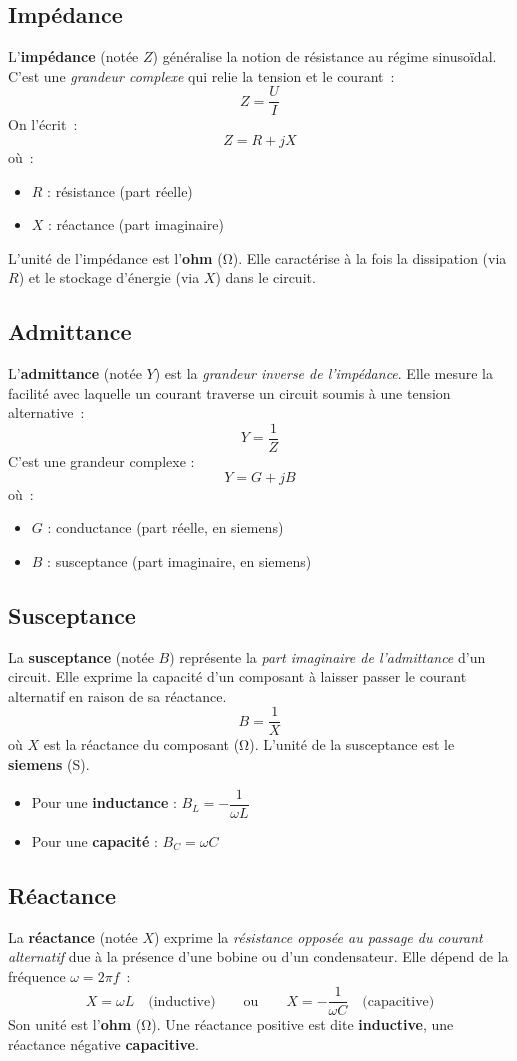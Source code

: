 \subsection{Imp\'edance}
L'\textbf{imp\'edance} (not\'ee $Z$) g\'en\'eralise la notion de r\'esistance au r\'egime sinusoïdal. C’est une \emph{grandeur complexe} qui relie la tension et le courant~:
\[
Z = \frac{U}{I}
\]
On l’\'ecrit~:
\[
Z = R + jX
\]
o\`u~:
\begin{itemize}
  \item $R$ : r\'esistance (part r\'eelle)
  \item $X$ : r\'eactance (part imaginaire)
\end{itemize}
L’unit\'e de l’imp\'edance est l’\textbf{ohm} (\unit{\ohm}). Elle caract\'erise à la fois la dissipation (via $R$) et le stockage d’\'energie (via $X$) dans le circuit.

\subsection{Admittance}
L'\textbf{admittance} (not\'ee $Y$) est la \emph{grandeur inverse de l'imp\'edance}. Elle mesure la facilit\'e avec laquelle un courant traverse un circuit soumis à une tension alternative~:
\[
Y = \frac{1}{Z}
\]
C’est une grandeur complexe :
\[
Y = G + jB
\]
o\`u~:
\begin{itemize}
  \item $G$ : conductance (part r\'eelle, en siemens)
  \item $B$ : susceptance (part imaginaire, en siemens)
\end{itemize}

\subsection{Susceptance}
La \textbf{susceptance} (not\'ee $B$) repr\'esente la \emph{part imaginaire de l'admittance} d'un circuit.
Elle exprime la capacit\'e d'un composant à laisser passer le courant alternatif en raison de sa r\'eactance.
\[
B = \frac{1}{X}
\]
o\`u $X$ est la r\'eactance du composant (\unit{\ohm}).
L'unit\'e de la susceptance est le \textbf{siemens} (\unit{\siemens}).
\begin{itemize}
  \item Pour une \textbf{inductance} : $B_L = -\dfrac{1}{\omega L}$
  \item Pour une \textbf{capacit\'e} : $B_C = \omega C$
\end{itemize}

\subsection{R\'eactance}
La \textbf{r\'eactance} (not\'ee $X$) exprime la \emph{r\'esistance oppos\'ee au passage du courant alternatif} due à la pr\'esence d’une bobine ou d’un condensateur. Elle d\'epend de la fr\'equence $\omega = 2\pi f$~:
\[
X = \omega L \quad \text{(inductive)} \qquad \text{ou} \qquad X = -\frac{1}{\omega C} \quad \text{(capacitive)}
\]
Son unit\'e est l’\textbf{ohm} (\unit{\ohm}). Une r\'eactance positive est dite \textbf{inductive}, une r\'eactance n\'egative \textbf{capacitive}.
